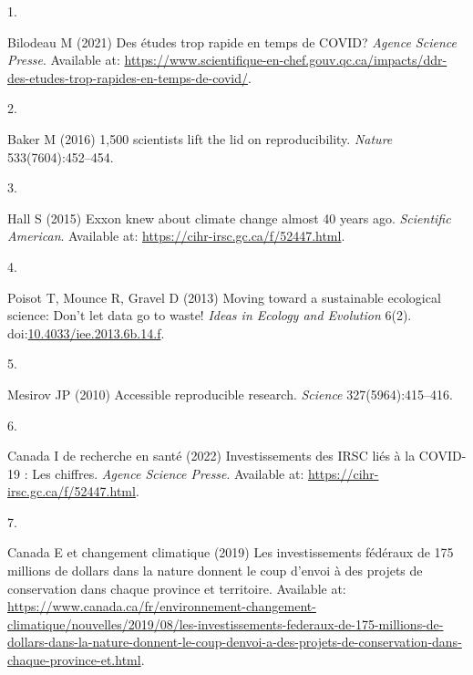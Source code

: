 \documentclass[9pt,twocolumn,twoside,]{pnas-new}
\newlength{\cslhangindent}
\newlength{\csllabelwidth}
\newlength{\cslentryspacingunit} %
\newenvironment{CSLReferences}[2] %
 {%
  \setlength{\parindent}{0pt}
  \ifodd #1
  \let\oldpar\par
  \def\par{\hangindent=\cslhangindent\oldpar}
  \fi
  \setlength{\parskip}{#2\cslentryspacingunit}
 }%
 {}
\newcommand{\CSLLeftMargin}[1]{\parbox[t]{\csllabelwidth}{#1}}
\newcommand{\CSLRightInline}[1]{\parbox[t]{\linewidth - \csllabelwidth}{#1}\break}
\begin{document}
\pnasbreak

\hypertarget{refs}{}
\begin{CSLReferences}{0}{0}
\leavevmode{}%
\CSLLeftMargin{1. }
\CSLRightInline{Bilodeau M (2021) Des études trop rapide en temps de
COVID? \emph{Agence Science Presse}. Available at:
\url{https://www.scientifique-en-chef.gouv.qc.ca/impacts/ddr-des-etudes-trop-rapides-en-temps-de-covid/}.}

\leavevmode{}%
\CSLLeftMargin{2. }
\CSLRightInline{Baker M (2016) 1,500 scientists lift the lid on
reproducibility. \emph{Nature} 533(7604):452--454.}

\leavevmode{}%
\CSLLeftMargin{3. }
\CSLRightInline{Hall S (2015) Exxon knew about climate change almost 40
years ago. \emph{Scientific American}. Available at:
\url{https://cihr-irsc.gc.ca/f/52447.html}.}

\leavevmode{}%
\CSLLeftMargin{4. }
\CSLRightInline{Poisot T, Mounce R, Gravel D (2013) Moving toward a
sustainable ecological science: Don't let data go to waste! \emph{Ideas
in Ecology and Evolution} 6(2).
doi:\href{https://doi.org/10.4033/iee.2013.6b.14.f}{10.4033/iee.2013.6b.14.f}.}

\leavevmode{}%
\CSLLeftMargin{5. }
\CSLRightInline{Mesirov JP (2010) Accessible reproducible research.
\emph{Science} 327(5964):415--416.}

\leavevmode{}%
\CSLLeftMargin{6. }
\CSLRightInline{Canada I de recherche en santé (2022) Investissements
des IRSC liés à la COVID-19 : Les chiffres. \emph{Agence Science
Presse}. Available at: \url{https://cihr-irsc.gc.ca/f/52447.html}.}

\leavevmode{}%
\CSLLeftMargin{7. }
\CSLRightInline{Canada E et changement climatique (2019) Les
investissements fédéraux de 175 millions de dollars dans la nature
donnent le coup d'envoi à des projets de conservation dans chaque
province et territoire. Available at:
\url{https://www.canada.ca/fr/environnement-changement-climatique/nouvelles/2019/08/les-investissements-federaux-de-175-millions-de-dollars-dans-la-nature-donnent-le-coup-denvoi-a-des-projets-de-conservation-dans-chaque-province-et.html}.}

\end{CSLReferences}



% 
\end{document}
